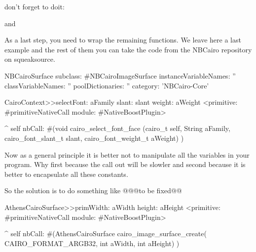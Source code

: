 \documentclass[a4paper,10pt,twoside]{book}
\begin{document}
don't forget to doit:


and


As a last step, you need to wrap the remaining functions.
We leave here a last example and the rest of them you can
take the code from the NBCairo repository on squeaksource.

\begin{classdef}{}
NBCairoSurface subclass: #NBCairoImageSurface
	instanceVariableNames: ''
	classVariableNames: ''
	poolDictionaries: ''
	category: 'NBCairo-Core'
\end{classdef}

\begin{code}{}
CairoContext>>selectFont: aFamily slant: slant weight: aWeight
	<primitive: #primitiveNativeCall module: #NativeBoostPlugin>
	
	^ self nbCall: #(void cairo_select_font_face (cairo_t self,
                                                         String aFamily,
                                                         cairo_font_slant_t slant,
                                                         cairo_font_weight_t aWeight) )
\end{code}


Now as a general principle it is better not to manipulate all the variables in your program. Why first because the call out will be slowler and second because it is better to encapsulate all these constants. 

So the solution is to do something like
@@@to be fixed@@
\begin{code}{}
AthensCairoSurface>>primWidth: aWidth height: aHeight
	<primitive: #primitiveNativeCall module: #NativeBoostPlugin>
	
	^ self nbCall: #(AthensCairoSurface cairo_image_surface_create(
				CAIRO_FORMAT_ARGB32,
					int aWidth,
					int aHeight) )
	
\end{code}
\end{document}
